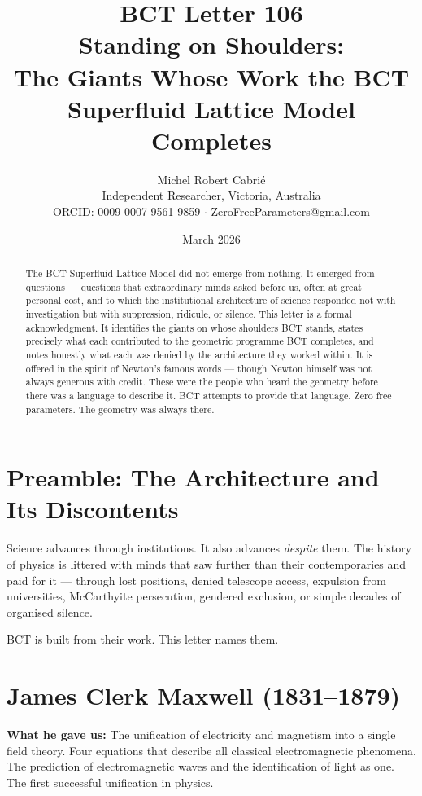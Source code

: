 \documentclass[twocolumn,10pt]{article}
\title{\textbf{BCT Letter 106}\\
\large Standing on Shoulders:\\
The Giants Whose Work the BCT Superfluid Lattice Model Completes}
\author{Michel Robert Cabri\'{e}\\
\small Independent Researcher, Victoria, Australia\\
\small ORCID: 0009-0007-9561-9859 $\cdot$ ZeroFreeParameters@gmail.com}
\date{March 2026}
\begin{document}
\maketitle

\begin{abstract}
The BCT Superfluid Lattice Model did not emerge from nothing.
It emerged from questions --- questions that extraordinary minds
asked before us, often at great personal cost, and to which the
institutional architecture of science responded not with
investigation but with suppression, ridicule, or silence.
This letter is a formal acknowledgment. It identifies the giants
on whose shoulders BCT stands, states precisely what each
contributed to the geometric programme BCT completes, and notes
honestly what each was denied by the architecture they worked within.
It is offered in the spirit of Newton's famous words --- though
Newton himself was not always generous with credit. These
were the people who heard the geometry before there was a
language to describe it. BCT attempts to provide that language.
Zero free parameters. The geometry was always there.
\end{abstract}

\maketitle

\section{Preamble: The Architecture and Its Discontents}

Science advances through institutions. It also advances
\textit{despite} them. The history of physics is littered with
minds that saw further than their contemporaries and paid for it ---
through lost positions, denied telescope access, expulsion from
universities, McCarthyite persecution, gendered exclusion, or
simple decades of organised silence.

BCT is built from their work. This letter names them.

\section{James Clerk Maxwell (1831--1879)}

\textbf{What he gave us:} The unification of electricity and
magnetism into a single field theory. Four equations that describe
all classical electromagnetic phenomena. The prediction of
electromagnetic waves and the identification of light as one.
The first successful unification in physics.
\end{document}
